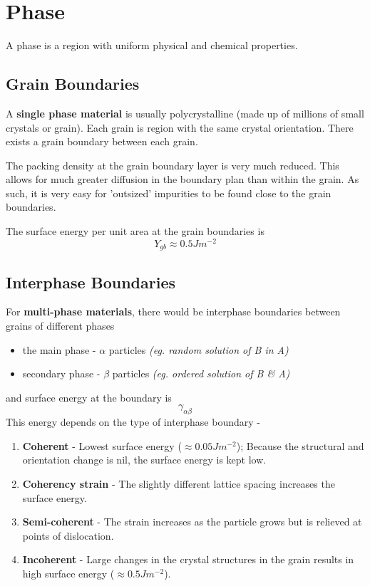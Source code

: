 \section{Phase} %
\label{sec:phase}
A phase is a region with uniform physical and chemical properties.

\subsection{Grain Boundaries} %
\label{sub:grain_boundaries}

A \textbf{single phase material} is usually polycrystalline (made up of millions of small crystals or grain). Each grain is region with the same crystal orientation. There exists a grain boundary between each grain.

The packing density at the grain boundary layer is very much reduced. This allows for much greater diffusion in the boundary plan than within the grain. As such, it is very easy for 'outsized' impurities to be found close to the grain boundaries.

The surface energy per unit area at the grain boundaries is
\begin{equation}
  Y_{gb} \approx 0.5 Jm^{-2}
\end{equation}

\subsection{Interphase Boundaries} %
\label{sub:interphase_boundaries}
For \textbf{multi-phase materials}, there would be interphase boundaries between grains of different phases
\begin{itemize}
  \item the main phase - $\alpha$ particles \emph{(eg. random solution of B in A)}
  \item secondary phase - $\beta$ particles \emph{(eg. ordered solution of B \& A)}
\end{itemize}
and surface energy at the boundary is 
\begin{equation}
  \gamma_{\alpha\beta}
\end{equation}
This energy depends on the type of interphase boundary -
\begin{enumerate}
  \item \textbf{Coherent} - Lowest surface energy ($\approx0.05Jm^{-2}$); Because the structural and orientation change is nil, the surface energy is kept low.
  \item \textbf{Coherency strain} - The slightly different lattice spacing increases the surface energy.
  \item \textbf{Semi-coherent} - The strain increases as the particle grows but is relieved at points of dislocation.
  \item \textbf{Incoherent} - Large changes in the crystal structures in the grain results in high surface energy ($\approx0.5Jm^{-2}$).
\end{enumerate}


